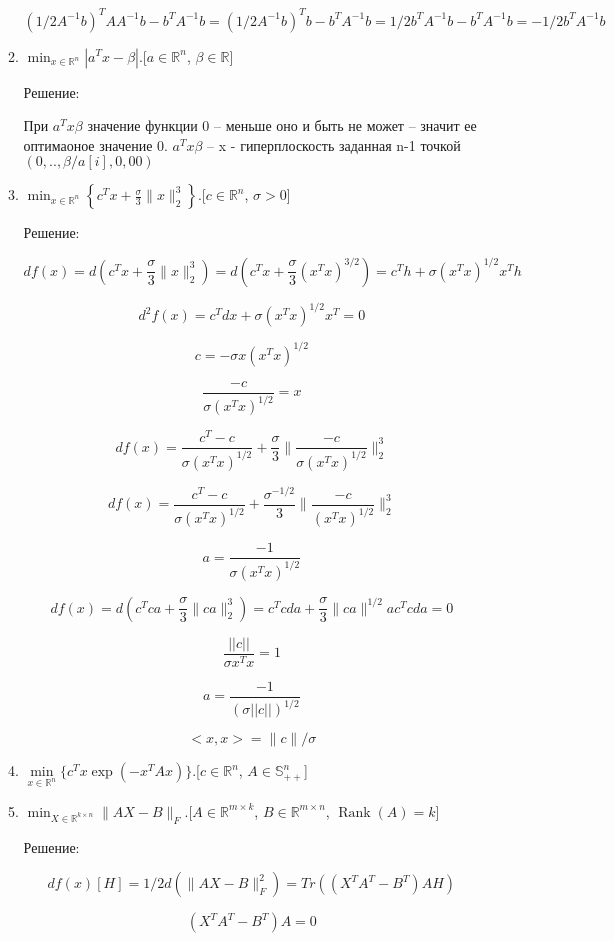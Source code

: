 \documentclass{article}
\newcommand{\R}{\mathbb{R}}
\renewcommand{\S}{\mathbb{S}}
\DeclareMathOperator*{\Rank}{Rank}
\begin{document}
\begin{enumerate}[label=\textbf{\arabic*}, leftmargin=0em]
\begin{enumerate}
$$
(1/2A^{-1}b)^T A A^{-1}b - b^T A^{-1}b = (1/2A^{-1}b)^Tb - b^T A^{-1}b = 1/2b^TA^{-1}b - b^TA^{-1}b =  -1/2 b^TA^{-1}b
$$

\item $\displaystyle \min_{x \in \R^n} |a^T x - \beta|$.\hfill[$a \in \R^n$, $\beta \in \R$]

Решение:

При $a^Tx \beta$ значение функции 0 -- меньше оно и быть не может -- значит ее оптимаоное значение 0.  $a^Tx \beta$ -- x - гиперплоскость заданная n-1 точкой $(0,..,\beta/a[i], 0,00)$

\item $\displaystyle \min_{x \in \R^n} \left\{ c^T x + \frac{\sigma}{3} \|x \|_2^3 \right\}$.\hfill[$c \in \R^n$, $\sigma > 0$]

Решение:

$$
d f(x) = d(c^T x + \frac{\sigma}{3} \|x \|_2^3 ) = d(c^T x + \frac{\sigma}{3} (x^Tx)^{3/2}) = c^Th + \sigma (x^Tx)^{1/2} x^Th
$$

$$
d^2 f(x) = c^Tdx + \sigma (x^Tx)^{1/2} x^T = 0
$$

$$
c = - \sigma x (x^Tx)^{1/2}
$$

$$
\frac{-c}{\sigma (x^Tx)^{1/2}} =  x
$$

$$
d f(x) = \frac{c^T-c}{\sigma (x^Tx)^{1/2}} + \frac{\sigma}{3} \|\frac{-c}{\sigma (x^Tx)^{1/2}}\|_2^3
$$


$$
d f(x) = \frac{c^T-c}{\sigma (x^Tx)^{1/2}} + \frac{\sigma^{-1/2}}{3} \|\frac{-c}{(x^Tx)^{1/2}}\|_2^3
$$

$$
a  = \frac{-1}{\sigma (x^Tx)^{1/2}}
$$

$$
d f(x) = d(c^Tca + \frac{\sigma}{3}\|ca\|_2^3) = c^Tc da + \frac{\sigma}{3} \|ca\|^{1/2}ac^Tcda = 0
$$

$$
\frac{||c||}{\sigma x^Tx} = 1
$$

$$
a = \frac{-1}{(\sigma||c||)^{1/2}}
$$


$$
<x,x> = \|c\|/\sigma
$$
\item $\displaystyle\min\limits_{x \in \R^n} \{ c^T x \exp(-x^T A x) \}$.\hfill[$c \in \R^n$, $A \in \S^n_{++}$]
\item $\displaystyle \min_{X \in \R^{k \times n}} \| A X - B \|_F$.\hfill[$A \in \R^{m \times k}$, $B \in \R^{m \times n}$, $\Rank(A) = k$]

Решение:

$$
df(x)[H] = 1/2 d(\| A X - B \|_F^2) = Tr((X^TA^T - B^T)AH)
$$

$$
(X^TA^T - B^T)A = 0
$$


\end{enumerate}
\end{enumerate}
\end{document}
